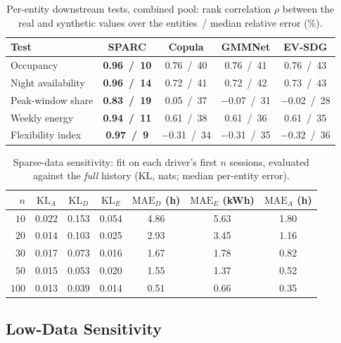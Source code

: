 \documentclass[journal]{IEEEtran}
\begin{document}
\begin{table}[t]
\centering
\caption{Per-entity downstream tests, combined pool: rank correlation $\rho$ between the real and synthetic values over the entities~/ median relative error (\%).}
\label{tab:entity}
\setlength{\tabcolsep}{3pt}
\footnotesize
\begin{tabular}{lcccc}
\toprule
Test & SPARC & Copula & GMMNet & EV-SDG \\
\midrule
Occupancy          & \textbf{0.96~/~10} & 0.76~/~40 & 0.76~/~41 & 0.76~/~43 \\
Night availability & \textbf{0.96~/~14} & 0.72~/~41 & 0.72~/~42 & 0.73~/~43 \\
Peak-window share  & \textbf{0.83~/~19} & 0.05~/~37 & $-$0.07~/~31 & $-$0.02~/~28 \\
Weekly energy      & \textbf{0.94~/~11} & 0.61~/~38 & 0.61~/~36 & 0.61~/~35 \\
Flexibility index  & \textbf{0.97~/~9}  & $-$0.31~/~34 & $-$0.31~/~35 & $-$0.32~/~36 \\
\bottomrule
\end{tabular}
\end{table}

\begin{table}[t]
\centering
\caption{Sparse-data sensitivity: fit on each driver's first $n$ sessions, evaluated against the \emph{full} history (KL, nats; median per-entity error).}
\label{tab:lowdata}
\setlength{\tabcolsep}{4pt}
\footnotesize
\begin{tabular}{rcccccc}
\toprule
$n$ & $\mathrm{KL}_A$ & $\mathrm{KL}_D$ & $\mathrm{KL}_E$ & $\mathrm{MAE}_D$ (h) & $\mathrm{MAE}_E$ (kWh) & $\mathrm{MAE}_A$ (h) \\
\midrule
$10$  & 0.022 & 0.153 & 0.054 & 4.86 & 5.63 & 1.80 \\
$20$  & 0.014 & 0.103 & 0.025 & 2.93 & 3.45 & 1.16 \\
$30$  & 0.017 & 0.073 & 0.016 & 1.67 & 1.78 & 0.82 \\
$50$  & 0.015 & 0.053 & 0.020 & 1.55 & 1.37 & 0.52 \\
$100$ & 0.013 & 0.039 & 0.014 & 0.51 & 0.66 & 0.35 \\
\bottomrule
\end{tabular}
\end{table}

\subsection{Low-Data Sensitivity}
\label{subsec:lowdata}
\end{document}
